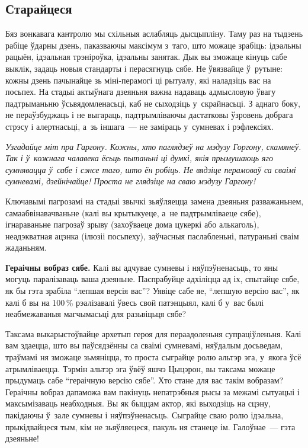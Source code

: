 \subsection*{Старайцеся}

Бяз вонкавага кантролю мы схільныя аслабляць дысцыпліну. Таму раз на тыдзень рабіце ўдарны дзень, паказваючы максімум з~таго, што можаце зрабіць: ідэальны рацыён, ідэальная трэніроўка, ідэальны занятак. Дык вы зможаце кінуць сабе выклік, задаць новыя стандарты і перасягнуць сябе. Не ўвязвайце ў~рутыне: кожны дзень пачынайце зь міні-перамогі ці рытуалу, які наладзіць вас на посьпех. На стадыі актыўнага дзеяньня важна надаваць адмысловую ўвагу падтрыманьню ўсьвядомленасьці, каб не сыходзіць у~скрайнасьці. З аднаго боку, не пераўзбуджаць і не выгараць, падтрымліваючы дастатковы ўзровень добрага стрэсу і алертнасьці, а~зь іншага~--- не заміраць у~сумневах і рэфлексіях.

\emph{Узгадайце міт пра Гаргону. Кожны, хто паглядзеў на мэдузу Горгону, скамянеў. Так і ў~кожнага чалавека ёсьць пытаньні ці думкі, якія прымушаюць яго сумнявацца ў~сабе і сэнсе таго, што ён робіць. Не вядзіце перамоваў са сваімі сумневамі, дзейнічайце! Проста не глядзіце на сваю мэдузу Гаргону!}

Ключавымі пагрозамі на стадыі звычкі зьяўляецца замена дзеяньня разважаньнем, самаабвінавачваньне (калі вы крытыкуеце, а~не падтрымліваеце сябе), ігнараваньне пагрозаў зрыву (захоўваеце дома цукеркі або алькаголь), неадэкватная ацэнка (ілюзіі посьпеху), заўчасныя паслабленьні, патураньні сваім жаданьням.

\textbf{Гераічны вобраз сябе.} Калі вы адчувае сумневы і няўпэўненасьць, то яны могуць паралізаваць ваша дзеяньне. Паспрабуйце адхіліцца ад іх, спытайце сябе, як бы гэта зрабіла ``лепшая версія вас''? Уявіце сабе яе, ``лепшую версію вас'', як калі б вы на 100\,\% рэалізавалі ўвесь свой патэнцыял, калі б у~вас былі неабмежаваныя магчымасьці для разьвіцьця сябе?

Таксама выкарыстоўвайце архетып героя для пераадоленьня супраціўленьня. Калі вам здаецца, што вы паўсядзённы са сваімі сумневамі, няўдалым досьведам, траўмамі ня зможаце зьмяніцца, то проста сыграйце ролю альтэр эга, у~якога ўсё атрымліваецца. Тэрмін альтэр эга ўвёў яшчэ Цыцэрон, вы таксама можаце прыдумаць сабе ``гераічную версію сябе''. Хто стане для вас такім вобразам? Гераічны вобраз дапаможа вам пакінуць непатрэбныя рысы за межамі сытуацыі і максымізаваць неабходныя. Вы як быццам актор, які выходзіць на сцэну, пакідаючы ў~зале сумневы і няўпэўненасьць. Сыграйце сваю ролю ідэальна, прыкідвайцеся тым, кім не зьяўляецеся, пакуль ня станеце ім. Галоўнае~--- гэта дзеяньне!

